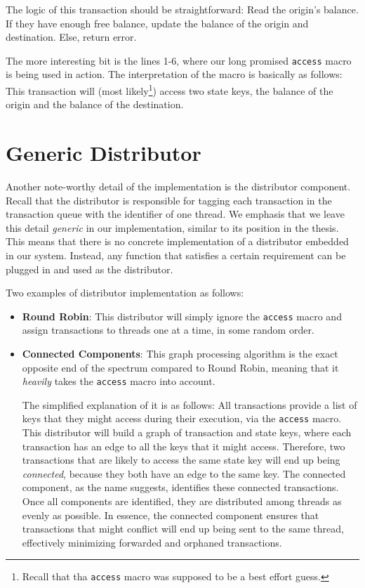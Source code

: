The logic of this transaction should be straightforward: Read the origin's balance. If they have
enough free balance, update the balance of the origin and destination. Else, return error.

The more interesting bit is the lines 1-6, where our long promised \texttt{access} macro is being
used in action. The interpretation of the macro is basically as follows: This transaction will (most
likely\footnote{Recall that tha \texttt{access} macro was supposed to be a best effort guess.})
access two state keys, the balance of the origin and the balance of the destination.

\section{Generic Distributor}

Another note-worthy detail of the implementation is the distributor component. Recall that the
distributor is responsible for tagging each transaction in the transaction queue with the identifier
of one thread. We emphasis that we leave this detail \textit{generic} in our implementation, similar
to its position in the thesis. This means that there is no concrete implementation of a distributor
embedded in our system. Instead, any function that satisfies a certain requirement can be plugged
in and used as the distributor.

Two examples of distributor implementation as follows:

\begin{itemize}
	\item \textbf{Round Robin}: This distributor will simply ignore the \texttt{access} macro and
	assign transactions to threads one at a time, in some random order.
	\item \textbf{Connected Components}\cite{nuutilaFindingStronglyConnected1994}: This graph
	processing algorithm is the exact opposite end of the spectrum compared to Round Robin, meaning
	that it \textit{heavily} takes the \texttt{access} macro into account.

	The simplified explanation of it is as follows: All transactions provide a list of keys that
	they might access during their execution, via the \texttt{access} macro. This distributor will
	build a graph of transaction and state keys, where each transaction has an edge to all the keys
	that it might access. Therefore, two transactions that are likely to access the same state key
	will end up being \textit{connected}, because they both have an edge to the same key. The
	connected component, as the name suggests, identifies these connected transactions. Once all
	components are identified, they are distributed among threads as evenly as possible. In essence,
	the connected component ensures that transactions that might conflict will end up being sent to
	the same thread, effectively minimizing forwarded and orphaned transactions.
\end{itemize}

